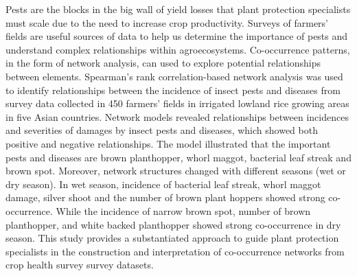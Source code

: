 \documentclass[12pt,a4paper]{article}
\begin{document}
Pests are the blocks in the big wall of yield losses that plant protection specialists must scale due to the need to increase crop productivity. Surveys of farmers' fields are useful sources of data to help us determine the importance of pests and understand complex relationships within agroecosystems. Co-occurrence patterns, in the form of network analysis, can used to explore potential relationships between elements. Spearman's rank correlation-based network analysis was used to identify relationships between the incidence of insect pests and diseases from survey data collected in 450 farmers' fields in irrigated lowland rice growing areas in five Asian countries. Network models revealed relationships between incidences and severities of damages by insect pests and diseases, which showed both positive and negative relationships. The model illustrated that the important pests and diseases are brown planthopper, whorl maggot, bacterial leaf streak and brown spot. Moreover, network structures changed with different seasons (wet or dry season). In wet season, incidence of bacterial leaf streak, whorl maggot damage, silver shoot and the number of brown plant hoppers showed strong co-occurrence. While the incidence of narrow brown spot, number of brown planthopper, and white backed planthopper showed strong co-occurrence in dry season. This study provides a substantiated approach to guide plant protection specialists in the construction and interpretation of co-occurrence networks from crop health survey survey datasets.
 
\end{document}
